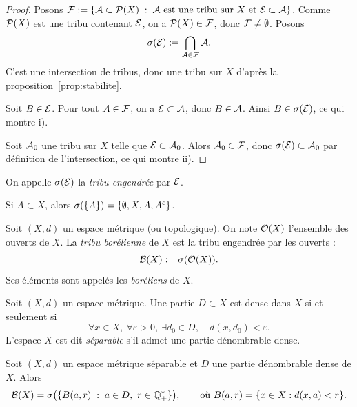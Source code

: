 \documentclass[11pt]{article}
\begin{document}
\begin{proof}
Posons $\mathcal{F} := \{\mathcal{A} \subset \mathcal{P}(X) \;:\; \mathcal{A} \text{ est une tribu sur } X \text{ et } \mathcal{E} \subset \mathcal{A}\}$. Comme $\mathcal{P}(X)$ est une tribu contenant $\mathcal{E}$, on a $\mathcal{P}(X) \in \mathcal{F}$, donc $\mathcal{F} \neq \emptyset$. Posons
\[
  \sigma(\mathcal{E}) := \bigcap_{\mathcal{A} \in \mathcal{F}} \mathcal{A}.
\]
C'est une intersection de tribus, donc une tribu sur $X$ d'après la proposition~\ref{prop:stabilite}.

Soit $B \in \mathcal{E}$. Pour tout $\mathcal{A} \in \mathcal{F}$, on a $\mathcal{E} \subset \mathcal{A}$, donc $B \in \mathcal{A}$. Ainsi $B \in \sigma(\mathcal{E})$, ce qui montre i).

Soit $\mathcal{A}_0$ une tribu sur $X$ telle que $\mathcal{E} \subset \mathcal{A}_0$. Alors $\mathcal{A}_0 \in \mathcal{F}$, donc $\sigma(\mathcal{E}) \subset \mathcal{A}_0$ par définition de l'intersection, ce qui montre ii).
\end{proof}

\begin{definition}
On appelle $\sigma(\mathcal{E})$ la \emph{tribu engendrée} par $\mathcal{E}$.
\end{definition}

\begin{exemple}
Si $A \subset X$, alors $\sigma(\{A\}) = \{\emptyset, X, A, {A}^{c}\}$.
\end{exemple}

\begin{definition}
Soit $(X,d)$ un espace métrique (ou topologique). On note $\mathcal{O}(X)$ l'ensemble des ouverts de $X$. La \emph{tribu borélienne} de $X$ est la tribu engendrée par les ouverts :
\[
  \mathcal{B}(X) := \sigma(\mathcal{O}(X)).
\]
Ses éléments sont appelés les \emph{boréliens} de $X$.
\end{definition}

\begin{remarque}
Soit $(X,d)$ un espace métrique. Une partie $D \subset X$ est dense dans $X$ si et seulement si
\[
  \forall x \in X,\ \forall \varepsilon > 0,\ \exists d_0 \in D,\quad d(x,d_0) < \varepsilon.
\]
L'espace $X$ est dit \emph{séparable} s'il admet une partie dénombrable dense.
\end{remarque}

\begin{proposition}\label{prop:separable}
Soit $(X,d)$ un espace métrique séparable et $D$ une partie dénombrable dense de $X$. Alors
\[
  \mathcal{B}(X) = \sigma\bigl(\{B(a,r) \;:\; a \in D,\ r \in \mathbb{Q}_+^*\}\bigr),
  \qquad\text{où } B(a,r) = \{x \in X : d(x,a) < r\}.
\]
\end{proposition}
\end{document}
